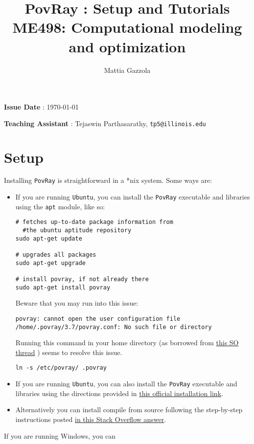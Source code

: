 \documentclass[11pt]{article}
\author{Mattia Gazzola}
\date{}
\title{PovRay : Setup and Tutorials\\\medskip
\large ME498: Computational modeling and optimization}
\begin{document}
\maketitle
\textbf{Issue Date} : \today

\textbf{Teaching Assistant} : Tejaswin Parthasarathy, \texttt{tp5@illinois.edu}

\section{Setup}
\label{sec:orged45d52}
Installing \texttt{PovRay} is straightforward in a *nix system. Some ways are:

\begin{itemize}
\item If you are running \texttt{Ubuntu}, you can install the \texttt{PovRay} executable and
libraries using the \texttt{apt} module, like so:
\begin{verbatim}
# fetches up-to-date package information from
  #the ubuntu aptitude repository
sudo apt-get update

# upgrades all packages
sudo apt-get upgrade

# install povray, if not already there
sudo apt-get install povray
\end{verbatim}
Beware that you may run into this issue:

\texttt{povray: cannot open the user configuration file /home/.povray/3.7/povray.conf: No such file or directory}

Running this command in your home directory (as borrowed from \href{https://askubuntu.com/questions/628496/using-pov-ray-installed-via-the-apt}{this SO thread}
 ) seems to resolve this issue.

\texttt{ln -s /etc/povray/ .povray}

\item If you are running \texttt{Ubuntu}, you can also install the \texttt{PovRay} executable and
libraries using the directions provided in \href{http://www.povray.org/download/linux.php}{this official installation link}.
\item Alternatively you can install compile from source following the step-by-step
instructions posted \href{https://askubuntu.com/a/414192}{in this Stack Overflow answer}.
\end{itemize}

If you are running Windows, you can
\end{document}
